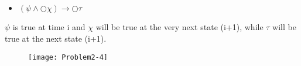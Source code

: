 \subsection{}

\begin{itemize}
   \item[] $(\psi \land \bigcirc \chi) \rightarrow \bigcirc \tau$ 
\end{itemize}


\noindent $\psi$ is true at time i and $\chi$ will be true at the very next state (i+1), while $\tau$ will
be true at the next state (i+1). 

\begin{figure}[h!]
	\centering \texttt{[image: Problem2-4]}
\end{figure}